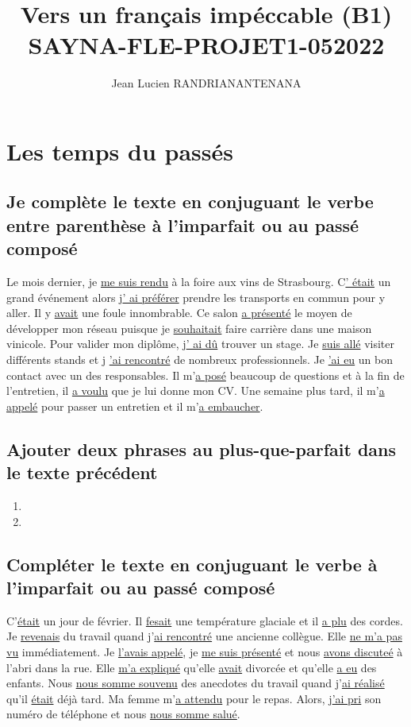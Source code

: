 \documentclass[12pt]{article}
\author{Jean Lucien RANDRIANANTENANA}
\title{Vers un français
impéccable (B1)\\SAYNA-FLE-PROJET1-052022}
\newcommand{\und}[1]{\underline{#1}}
\begin{document}
\maketitle

\section{Les temps du passés}
\subsection{Je complète le texte en conjuguant le verbe entre parenthèse à l'imparfait ou au passé composé}


Le mois dernier, je \und{me suis rendu} à la foire aux vins de Strasbourg. C\und{' était} un grand événement
alors j\und{' ai préférer} prendre les transports en commun pour y aller. Il y \und{avait} une foule
innombrable. Ce salon  \und{a présenté} le moyen de développer mon réseau puisque je \und{souhaitait} faire carrière dans une maison vinicole.
Pour valider mon diplôme, j\und{' ai dû} trouver un stage. Je \und{suis allé} visiter différents stands et j
\und{'ai rencontré} de nombreux professionnels. Je \und{'ai eu} un bon contact avec un des responsables.
Il m'\und{a posé} beaucoup de questions et à la fin de l’entretien, il \und{a voulu} que je lui donne mon
CV. Une semaine plus tard, il m'\und{a appelé} pour passer un entretien et il m'\und{a embaucher}.


\subsection{Ajouter deux phrases au plus-que-parfait dans le texte précédent}
\begin{enumerate}
	\item
	\item
\end{enumerate}

\subsection{Compléter le texte en conjuguant le verbe à l’imparfait ou au passé composé}

C'\und{était} un jour de février. Il \und{fesait} une température glaciale et il \und{a plu} des cordes.
Je \und{revenais} du travail quand j'\und{ai rencontré} une ancienne collègue. Elle \und{ne m'a pas vu} immédiatement.
Je \und{l'avais appelé}, je \und{me suis présenté} et nous \und{avons discuteé} à l’abri dans la rue.
Elle \und{m'a expliqué} qu’elle \und{avait} divorcée et qu’elle \und{a eu} des enfants. Nous \und{nous somme souvenu} des anecdotes du travail quand j'\und{ai réalisé} qu’il \und{était} déjà tard.
Ma femme m'\und{a attendu} pour le repas. Alors, j\und{'ai pri} son numéro de téléphone et nous \und{nous somme salué}.
\end{document}
